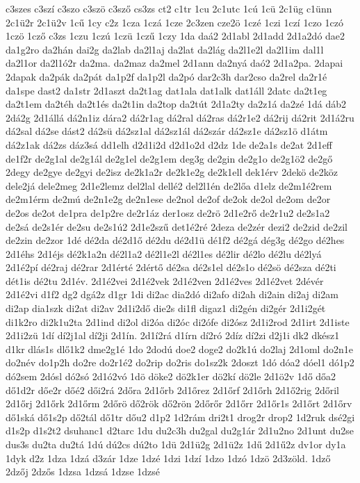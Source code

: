 {c3szes
c3szí
c3szo
c3szö
c3sző
cs3zs
ct2
c1tr
1cu
2c1utc
1cú
1cü
2c1üg
c1ünn
2c1ü2r
2c1ü2v
1cű
1cy
c2z
1cza
1czá
1cze
2c3zen
cze2ö
1czé
1czi
1czí
1czo
1czó
1czö
1cző
c3zs
1czu
1czú
1czü
1czű
1czy
1da
daá2
2d1abl
2d1add
2d1a2dó
dae2
da1g2ro
da2hán
dai2g
da2lab
da2l1aj
da2lat
da2lág
da2l1e2l
da2l1im
dal1l
da2l1or
da2l1ó2r
da2ma.
da2maz
da2mel
2d1ann
da2nyá
daó2
2d1a2pa.
2dapai
2dapak
da2pák
da2pát
da1p2f
da1p2l
da2pó
dar2c3h
dar2cso
da2rel
da2r1é
da1spe
dast2
da1str
2d1aszt
da2t1ag
dat1ala
dat1alk
dat1áll
2datc
da2t1eg
da2t1em
da2téh
da2t1és
da2t1in
da2top
da2tút
2d1a2ty
da2z1á
da2zé
1dá
dáb2
2dá2g
2d1állá
dá2n1iz
dára2
dá2r1ag
dá2ral
dá2ras
dá2r1e2
dá2rij
dá2rit
2d1á2ru
dá2sal
dá2se
dást2
dá2sü
dá2sz1al
dá2sz1ál
dá2szár
dá2sz1e
dá2sz1ö
d1átm
dá2z1ak
dá2zs
dáz3sá
dd1elh
d2d1i2d
d2d1o2d
d2dz
1de
de2a1s
de2at
2d1eff
de1f2r
de2g1al
de2g1ál
de2g1el
de2g1em
deg3g
de2gin
de2g1o
de2g1ö2
de2gő
2degy
de2gye
de2gyi
de2isz
de2k1a2r
de2k1e2g
de2k1ell
dek1érv
2dekö
de2köz
dele2já
dele2meg
2d1e2lemz
del2lal
dellé2
del2l1én
de2lőa
d1elz
de2m1é2rem
de2m1érm
de2mú
de2n1e2g
de2n1ese
de2nol
de2of
de2ok
de2ol
de2om
de2or
de2os
de2ot
de1pra
de1p2re
de2r1áz
der1osz
de2rö
2d1e2rő
de2r1u2
de2s1a2
de2sá
de2s1ér
de2su
de2s1ú2
2d1e2szű
det1é2ré
2deza
de2zér
dezi2
de2zid
de2zil
de2zin
de2zor
1dé
dé2da
dé2d1ő
dé2du
dé2d1ü
dé1f2
dé2gá
dég3g
dé2go
dé2hes
2d1éhs
2d1éjs
dé2k1a2n
dé2l1a2
dé2l1e2l
dé2l1es
dé2lir
dé2lo
dé2lu
dé2lyá
2d1é2pí
dé2raj
dé2rar
2d1érté
2dértő
dé2sa
dé2s1el
dé2s1o
dé2sö
dé2sza
dé2ti
dét1is
dé2tu
2d1év.
2d1é2vei
2d1é2vek
2d1é2ven
2d1é2ves
2d1é2vet
2dévér
2d1é2vi
d1f2
dg2
dgá2z
d1gr
1di
di2ac
dia2dó
di2afo
di2ah
di2ain
di2aj
di2am
di2ap
dia1szk
di2at
di2av
2d1i2dő
die2s
di1fl
digaz1
di2gén
di2gér
2d1i2gét
di1k2ro
di2k1u2ta
2d1ind
di2ol
di2óa
di2óc
di2ófe
di2ósz
2d1i2rod
2d1irt
2d1iste
2d1i2zü
1dí
dí2j1al
dí2ji
2d1ín.
2d1í2rá
d1írn
dí2ró
2díz
dí2zi
d2j1i
dk2
dkész1
d1kr
dlás1s
dlő1k2
dme2g1é
1do
2dodú
doe2
doge2
do2k1ú
do2laj
2d1oml
do2n1e
do2név
do1p2h
do2re
do2r1é2
do2rip
do2ris
do1sz2k
2doszt
1dó
dóa2
dóel1
dó1p2
dó2sem
2dósl
dó2só
2d1ó2vó
1dö
döke2
dö2k1er
dö2kí
dö2le
2d1ö2v
1dő
dőa2
dő1d2r
dőe2r
dőé2
dői2rá
2dőra
2d1őrb
2d1őrez
2d1őrf
2d1őrh
2d1ő2rig
2dőril
2d1őrj
2d1őrk
2d1őrm
2dőrö
dő2rök
dő2rön
2dőrőr
2d1őrr
2d1őr1s
2d1őrt
2d1őrv
dő1ská
dő1s2p
dő2tál
dő1tr
dőu2
d1p2
1d2rám
dri2t1
drog2r
drop2
1d2ruk
dsé2gi
d1s2p
d1s2t2
dsuhanc1
d2tarc
1du
du2c3h
du2gal
du2g1ár
2d1u2no
2d1unt
du2se
dus3s
du2ta
du2tá
1dú
dú2cs
dú2to
1dü
2d1ü2g
2d1ü2z
1dű
2d1ű2z
dv1or
dy1a
1dyk
d2z
1dza
1dzá
d3zár
1dze
1dzé
1dzi
1dzí
1dzo
1dzó
1dzö
2d3zöld.
1dző
2dzőj
2dzős
1dzsa
1dzsá
1dzse
1dzsé
}
